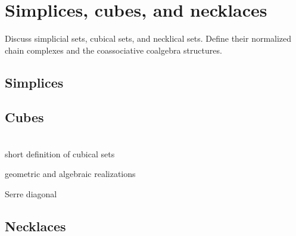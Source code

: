 \section{Simplices, cubes, and necklaces}

Discuss simplicial sets, cubical sets, and necklical sets. Define their normalized chain complexes and the coassociative coalgebra structures.

\subsection{Simplices}

\subsection{Cubes}\ \\

short definition of cubical sets

geometric and algebraic realizations

Serre diagonal

\subsection{Necklaces}